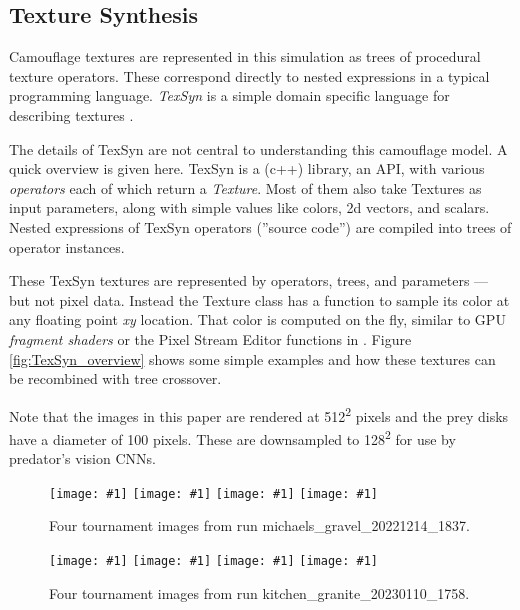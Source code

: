 \documentclass[letterpaper]{article}
\newcommand{\jargon}[1]{\textit{#1}}
\newcommand{\texsyn}[0]{TexSyn}
\newcommand{\runID}{\footnotesize}
\newcommand{\igfour}[1]{\texttt{[image: \#1]}}
\begin{document}

\subsection{Texture Synthesis}
\label{subsec:texture_synthesis}
Camouflage textures are represented in this simulation as trees of procedural texture operators. These correspond directly to nested expressions in a typical programming language. \jargon{\texsyn{}} is a simple domain specific language for describing textures \citep{reynolds_texsyn_2019}.
\par
The details of \texsyn{} are not central to understanding this camouflage model. A quick overview is given here. \texsyn{} is a (c++) library, an API, with various \jargon{operators} each of which return a \jargon{Texture}. Most of them also take Textures as input parameters, along with simple values like colors, 2d vectors, and scalars. Nested expressions of \texsyn{} operators (''source code'') are compiled into trees of operator instances.
\par
These \texsyn{} textures are represented by operators, trees, and parameters --- but not pixel data. Instead the Texture class has a function to sample its color at any floating point \textit{xy} location. That color is computed on the fly, similar to GPU \jargon{fragment shaders} or the Pixel Stream Editor functions in \citet{perlin_image_1985}. Figure \ref{fig:TexSyn_overview} shows some simple examples and how these textures can be recombined with tree crossover.
\par
Note that the images in this paper are rendered at 512\textsuperscript{2} pixels and the prey disks have a diameter of 100 pixels. These are downsampled to 128\textsuperscript{2} for use by predator's vision CNNs. 
\par


\begin{figure}[t]
    \igfour{20221215_step_5867.png}
    \hfill
    \igfour{20221215_step_5892.png}
    \hfill
    \igfour{20221215_step_6830.png}
    \hfill
    \igfour{20221215_step_6916.png}
    \caption{Four tournament images from run {\runID michaels\_gravel\_20221214\_1837}.}
    \label{fig:michaels_gravel_4x}
\end{figure}

\begin{figure}[t]
    \igfour{20230111_step_5576.png}
    \hfill
    \igfour{20230111_step_6159.png}
    \hfill
    \igfour{20230111_step_6303.png}
    \hfill
    \igfour{20230111_step_6726.png}
    \caption{Four tournament images from run {\runID kitchen\_granite\_20230110\_1758}.}
    \label{fig:kitchen_granite_4x}
\end{figure}
\end{document}
